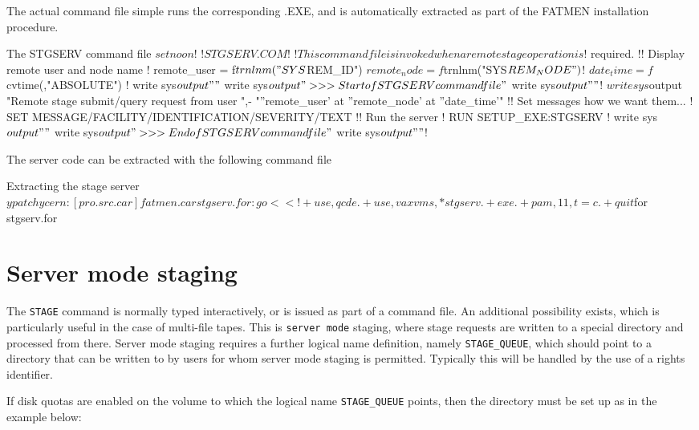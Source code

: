 The actual command file simple runs the corresponding .EXE,
and is automatically extracted as part of the FATMEN installation
procedure.

\begin{XMPt}{The STGSERV command file}
$ set noon
$!
$! STGSERV.COM
$!
$! This command file is invoked when a remote stage operation is
$! required.
$!
$! Display remote user and node name
$!
$  remote_user = f$trnlnm("SYS$REM_ID")
$  remote_node = f$trnlnm("SYS$REM_NODE")
$!
$  date_time   = f$cvtime(,"ABSOLUTE")
$!
$  write sys$output ""
$  write sys$output ">>> Start of STGSERV command file"
$  write sys$output ""
$!
$  write sys$output "Remote stage submit/query request from user ",-
"''remote_user' at ''remote_node' at ''date_time'"
$!
$! Set messages how we want them...
$!
$  SET MESSAGE/FACILITY/IDENTIFICATION/SEVERITY/TEXT
$!
$! Run the server
$!
$  RUN SETUP_EXE:STGSERV
$!
$  write sys$output ""
$  write sys$output ">>> End of STGSERV command file"
$  write sys$output ""
$!
\end{XMPt}

The server code can be extracted with the following command file

\begin{XMPt}{Extracting the stage server}
$ypatchy cern:[pro.src.car]fatmen.car stgserv.for :go <<!
+use,qcde.
+use,vaxvms,*stgserv.
+exe.
+pam,11,t=c.
+quit
$for stgserv.for
\end{XMPt}

\section{Server mode staging}

The {\tt STAGE} command is normally typed interactively,
or is issued as part of a command file.
An additional possibility exists, which is particularly
useful in the case of multi-file tapes. This is
{\tt server mode} staging, where stage requests are
written to a special directory and processed from there.
Server mode staging requires a further logical name definition,
namely {\tt STAGE\_QUEUE}, which should point to a directory
that can be written to by users for whom server mode staging
is permitted. Typically this will be handled by the use of
a rights identifier.

If disk quotas are enabled on the volume to which the logical
name {\tt STAGE\_QUEUE} points, then the directory must be
set up as in the example below:

